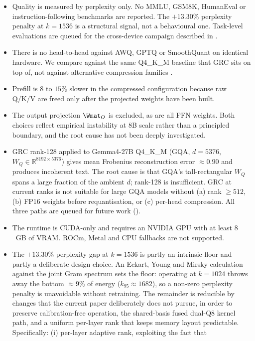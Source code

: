 \documentclass[11pt]{article}
\begin{document}
\begin{itemize}
\item Quality is measured by perplexity only. No MMLU, GSM8K, HumanEval
or instruction-following benchmarks are reported. The $+13.30\%$
perplexity penalty at $k{=}1536$ is a structural signal, not a
behavioural one. Task-level evaluations are queued for the cross-device
campaign described in .
\item There is no head-to-head against AWQ, GPTQ or SmoothQuant on
identical hardware. We compare against the same Q4\_K\_M baseline that
GRC sits on top of, not against alternative compression families
\cite{lin2023awq,frantar2022gptq,xiao2022smoothquant}.
\item Prefill is $8$ to $15\%$ slower in the compressed configuration
because raw Q/K/V are freed only after the projected weights have been
built.
\item The output projection $\Wmat_O$ is excluded, as are all FFN
weights. Both choices reflect empirical instability at 8B scale rather
than a principled boundary, and the root cause has not been deeply
investigated.
\item GRC rank-128 applied to Gemma4-27B Q4\_K\_M (GQA, $d{=}5376$,
$W_Q\!\in\!\mathbb{R}^{8192\times5376}$) gives mean Frobenius
reconstruction error ${\approx}0.90$ and produces incoherent text. The
root cause is that GQA's tall-rectangular $W_Q$ spans a large fraction
of the ambient $d$; rank-128 is insufficient. GRC at current ranks is
not suitable for large GQA models without (a) rank ${\geq}512$,
(b) FP16 weights before requantisation, or (c) per-head compression.
All three paths are queued for future work ().
\item The runtime is CUDA-only and requires an NVIDIA GPU with at least
$8$~GB of VRAM. ROCm, Metal and CPU fallbacks are not supported.
\item The $+13.30\%$ perplexity gap at $k{=}1536$ is partly an
intrinsic floor and partly a deliberate design choice. An Eckart, Young
and Mirsky calculation against the joint Gram spectrum sets the floor:
operating at $k{=}1024$ throws away the bottom ${\approx}9\%$ of energy
($k_{95}{\approx}1682$), so a non-zero perplexity penalty is unavoidable
without retraining. The remainder is reducible by changes that the
current paper deliberately does not pursue, in order to preserve
calibration-free operation, the shared-basis fused dual-Q8 kernel path,
and a uniform per-layer rank that keeps memory layout predictable.
Specifically: (i) per-layer adaptive rank, exploiting the fact that

\end{itemize}
\end{document}
